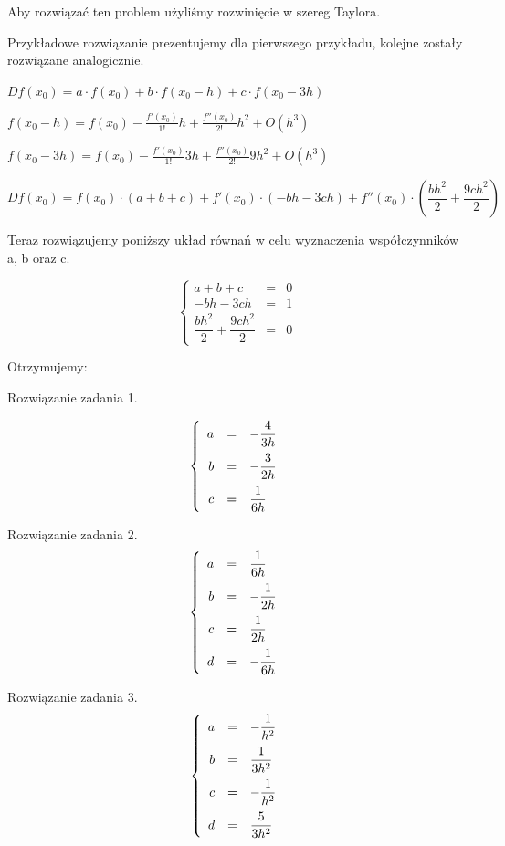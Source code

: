Aby rozwiązać ten problem użyliśmy rozwinięcie w szereg Taylora.

Przykładowe rozwiązanie prezentujemy dla pierwszego przykładu, kolejne zostały rozwiązane analogicznie.

\vspace{1cm}


$Df(x_{0}) = a \cdot f(x_{0}) + b \cdot f(x_{0}-h) + c \cdot f(x_{0}-3h) $

$f(x_{0}-h) = f(x_{0}) - \frac{f'(x_{0})}{1!}h + \frac{f''(x_{0})}{2!}h^2 + O(h^3)$

$f(x_{0}-3h) = f(x_{0}) - \frac{f'(x_{0})}{1!}3h + \frac{f''(x_{0})}{2!}9h^2 + O(h^3)$

$Df(x_{0}) = f(x_{0}) \cdot (a+b+c) + f'(x_{0}) \cdot (-bh-3ch) + f''(x_{0}) \cdot (\dfrac{bh^2}{2} + \dfrac{9ch^2}{2}) $

Teraz rozwiązujemy poniższy układ równań w celu wyznaczenia współczynników a, b oraz c.

$$\left\{\begin{array}{rcl}
a+b+c&=&0\\
-bh-3ch&=&1\\
\dfrac{bh^2}{2} + \dfrac{9ch^2}{2}&=&0
\end{array} \right.$$

Otrzymujemy:

Rozwiązanie zadania 1.

$$\left\{\begin{array}{rcl}
\vspace{0.2cm}
a&=&-\dfrac{4}{3h}\\
\vspace{0.2cm}
b&=&-\dfrac{3}{2h}\\
c&=&\dfrac{1}{6h}
\end{array} \right.$$


Rozwiązanie zadania 2.
$$\left\{\begin{array}{rcl}
\vspace{0.2cm}
a&=&\dfrac{1}{6h}\\
\vspace{0.2cm}
b&=&-\dfrac{1}{2h}\\
\vspace{0.2cm}
c&=&\dfrac{1}{2h} \\
d&=&-\dfrac{1}{6h}
\end{array} \right.$$

Rozwiązanie zadania 3.
$$\left\{\begin{array}{rcl}
\vspace{0.2cm}
a&=&-\dfrac{1}{h^2}\\
\vspace{0.2cm}
b&=&\dfrac{1}{3h^2}\\
\vspace{0.2cm}
c&=&-\dfrac{1}{h^2} \\
d&=&\dfrac{5}{3h^2}
\end{array} \right.$$











